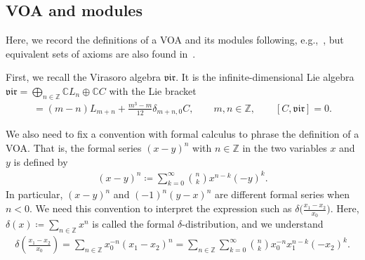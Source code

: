 \documentclass[pdftex]{sigma}
\numberwithin{equation}{section}
\newcommand{\bC}{\mathbb{C}}
\newcommand{\bZ}{\mathbb{Z}}
\newcommand{\vir}{\mathfrak{vir}}
\begin{document}
\subsection{VOA and modules}
Here, we record the definitions of a VOA and its modules following, e.g.,~\cite{FLM-VOAs_Monster,Lepowsky_Li-VOA}, but equivalent sets of axioms are also found in~\cite{FrenkelBen-Zvi2004,Kac-vertex_algebras}.

First, we recall the Virasoro algebra $\vir$.
It is the infinite-dimensional Lie algebra $\vir=\bigoplus_{n\in\bZ}\bC L_{n}\oplus \bC C$ with the Lie bracket
\begin{align*}
 [L_{m},L_{n}]=(m-n)L_{m+n}+\frac{m^{3}-m}{12}\delta_{m+n,0}C,\qquad m,n\in\bZ, \qquad
 [C,\vir] = 0.
\end{align*}

We also need to fix a convention with formal calculus to phrase the definition of a VOA.
That is, the formal series $(x-y)^{n}$ with $n\in\mathbb{Z}$ in the two variables $x$ and $y$ is defined by
\begin{align*}
	(x-y)^{n} \coloneqq \sum_{k=0}^{\infty}\binom{n}{k}x^{n-k}(-y)^{k}.
\end{align*}
In particular, $(x-y)^{n}$ and $(-1)^{n}(y-x)^{n}$ are different formal series when $n<0$.
We need this convention to interpret the expression such as
$
	\delta \big(\frac{x_{1}-x_{2}}{x_{0}}\big)$.
Here, $\delta (x) \coloneqq \sum_{n\in\bZ}x^{n}$ is called the formal $\delta$-distribution,
and we understand
\begin{align*}
	\delta \left(\frac{x_{1}-x_{2}}{x_{0}}\right)
	=\sum_{n\in\bZ}x_{0}^{-n}(x_{1}-x_{2})^{n}
	=\sum_{n\in\bZ}\sum_{k=0}^{\infty}\binom{n}{k}x_{0}^{-n}x_{1}^{n-k}(-x_{2})^{k}.
\end{align*}
\end{document}
